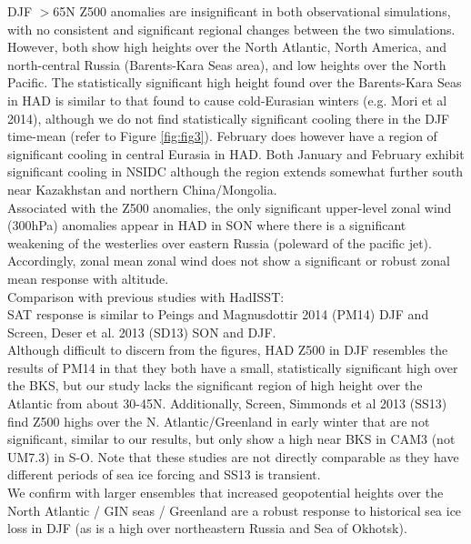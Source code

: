\documentclass[twocol]{ametsoc}
\begin{document}
DJF $>$65N Z500 anomalies are insignificant in both observational simulations, with no consistent and significant regional changes between the two simulations. However, both show high heights over the North Atlantic, North America, and north-central Russia (Barents-Kara Seas area), and low heights over the North Pacific. The statistically significant high height found over the Barents-Kara Seas in HAD is similar to that found to cause cold-Eurasian winters (e.g. Mori et al 2014), although we do not find statistically significant cooling there in the DJF time-mean (refer to Figure \ref{fig:fig3}). February does however have a region of significant cooling in central Eurasia in HAD. Both January and February exhibit significant cooling in NSIDC although the region extends somewhat further south near Kazakhstan and northern China/Mongolia.\\

Associated with the Z500 anomalies, the only significant upper-level zonal wind (300hPa) anomalies appear in HAD in SON where there is a significant weakening of the westerlies over eastern Russia (poleward of the pacific jet). Accordingly, zonal mean zonal wind does not show a significant or robust zonal mean response with altitude.\\

Comparison with previous studies with HadISST:\\
SAT response is similar to Peings and Magnusdottir 2014 (PM14) DJF and Screen, Deser et al. 2013 (SD13) SON and DJF. \\
Although difficult to discern from the figures, HAD Z500 in DJF resembles the results of PM14 in that they both have a small, statistically significant high over the BKS, but our study lacks the significant region of high height over the Atlantic from about 30-45N. Additionally, Screen, Simmonds et al 2013 (SS13) find Z500 highs over the N. Atlantic/Greenland in early winter that are not significant, similar to our results, but only show a high near BKS in CAM3 (not UM7.3) in S-O. Note that these studies are not directly comparable as they have different periods of sea ice forcing and SS13 is transient.\\
We confirm with larger ensembles that increased geopotential heights over the North Atlantic / GIN seas / Greenland are a robust response to historical sea ice loss in DJF (as is a high over northeastern Russia and Sea of Okhotsk).\\ %
\end{document}
